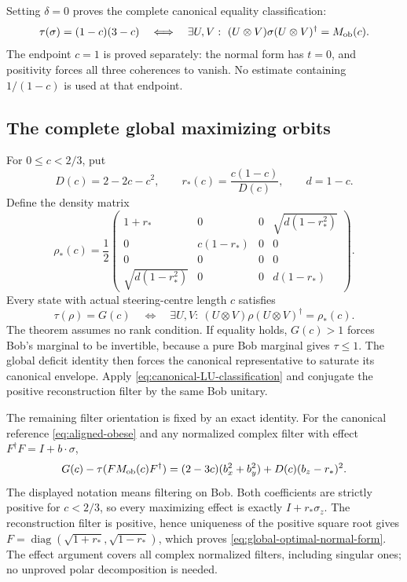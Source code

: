 Setting \(\delta=0\) proves the complete canonical equality classification:
\begin{equation}
 \tau(\sigma)=(1-c)(3-c)
 \quad\Longleftrightarrow\quad
 \exists U,V:\ (U\otimes V)\sigma(U\otimes V)^\dagger=M_{\rm ob}(c).
 \label{eq:canonical-LU-classification}
\end{equation}
The endpoint \(c=1\) is proved separately: the normal form has \(t=0\),
and positivity forces all three coherences to vanish.  No estimate
containing \(1/(1-c)\) is used at that endpoint.

\subsection{The complete global maximizing orbits}

For \(0\leq c<2/3\), put
\[
 D(c)=2-2c-c^2,\qquad r_*(c)=\frac{c(1-c)}{D(c)},\qquad d=1-c.
\]
Define the density matrix
\begin{equation}
 \rho_*(c)=\frac12
 \begin{pmatrix}
 1+r_*&0&0&\sqrt{d(1-r_*^2)}\\
 0&c(1-r_*)&0&0\\
 0&0&0&0\\
 \sqrt{d(1-r_*^2)}&0&0&d(1-r_*)
 \end{pmatrix}.
 \label{eq:global-optimal-normal-form}
\end{equation}
Every state with actual steering-centre length \(c\) satisfies
\begin{equation}
 \tau(\rho)=G(c)
 \quad\Longleftrightarrow\quad
 \exists U,V:\ (U\otimes V)\rho(U\otimes V)^\dagger=\rho_*(c).
 \label{eq:global-LU-classification}
\end{equation}
The theorem assumes no rank condition.  If equality holds, \(G(c)>1\)
forces Bob's marginal to be invertible, because a pure Bob marginal gives
\(\tau\leq1\).  The global deficit identity then forces the canonical
representative to saturate its canonical envelope.  Apply
\eqref{eq:canonical-LU-classification} and conjugate the positive
reconstruction filter by the same Bob unitary.

The remaining filter orientation is fixed by an exact identity.  For the
canonical reference \eqref{eq:aligned-obese} and any normalized complex
filter with effect \(F^\dagger F=I+b\cdot\sigma\),
\begin{equation}
 G(c)-\tau(FM_{\rm ob}(c)F^\dagger)
 =(2-3c)(b_x^2+b_y^2)+D(c)(b_z-r_*)^2.
 \label{eq:obese-directional-completed-square}
\end{equation}
The displayed notation means filtering on Bob.  Both coefficients are
strictly positive for \(c<2/3\), so every maximizing effect is exactly
\(I+r_*\sigma_z\).  The reconstruction filter is positive, hence uniqueness
of the positive square root gives
\(F=\operatorname{diag}(\sqrt{1+r_*},\sqrt{1-r_*})\), which proves
\eqref{eq:global-optimal-normal-form}.  The effect argument covers all
complex normalized filters, including singular ones; no unproved polar
decomposition is needed.

